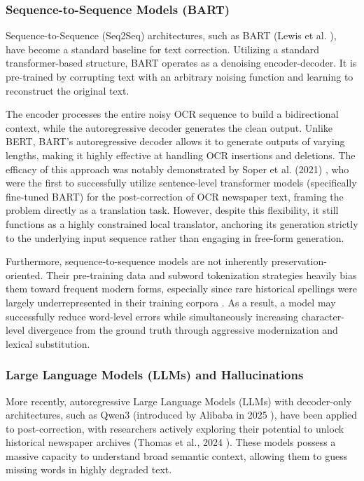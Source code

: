 \documentclass[11pt]{extarticle}
\begin{document}
\subsubsection{Sequence-to-Sequence Models (BART)}
Sequence-to-Sequence (Seq2Seq) architectures, such as BART (Lewis et al. \cite{lewis2019bartdenoisingsequencetosequencepretraining}), have become a standard baseline for text correction. Utilizing a standard transformer-based structure, BART operates as a denoising encoder-decoder. It is pre-trained by corrupting text with an arbitrary noising function and learning to reconstruct the original text. 

The encoder processes the entire noisy OCR sequence to build a bidirectional context, while the autoregressive decoder generates the clean output. Unlike BERT, BART's autoregressive decoder allows it to generate outputs of varying lengths, making it highly effective at handling OCR insertions and deletions. The efficacy of this approach was notably demonstrated by Soper et al. (2021) \cite{soper-etal-2021-bart}, who were the first to successfully utilize sentence-level transformer models (specifically fine-tuned BART) for the post-correction of OCR newspaper text, framing the problem directly as a translation task. However, despite this flexibility, it still functions as a highly constrained local translator, anchoring its generation strictly to the underlying input sequence rather than engaging in free-form generation.

Furthermore, sequence-to-sequence models are not inherently preservation-oriented. Their pre-training data and subword tokenization strategies heavily bias them toward frequent modern forms, especially since rare historical spellings were largely underrepresented in their training corpora \cite{soper-etal-2021-bart}. As a result, a model may successfully reduce word-level errors while simultaneously increasing character-level divergence from the ground truth through aggressive modernization and lexical substitution.

\subsubsection{Large Language Models (LLMs) and Hallucinations}
More recently, autoregressive Large Language Models (LLMs) with decoder-only architectures, such as Qwen3 (introduced by Alibaba in 2025 \cite{yang2025qwen3technicalreport}), have been applied to post-correction, with researchers actively exploring their potential to unlock historical newspaper archives (Thomas et al., 2024 \cite{thomas-etal-2024-leveraging}). These models possess a massive capacity to understand broad semantic context, allowing them to guess missing words in highly degraded text.
\end{document}
